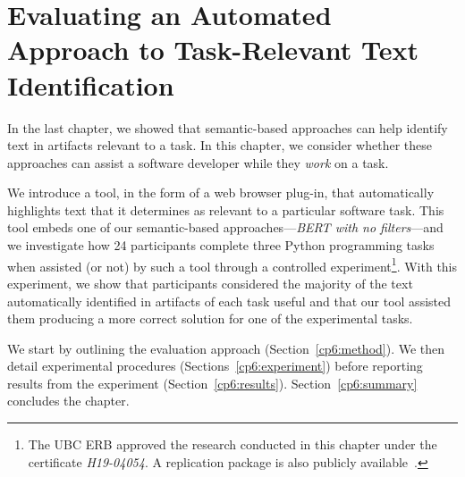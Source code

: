 \setcounter{chapter}{5}


\chapter{Evaluating an Automated Approach to Task-Relevant Text Identification}
\label{ch:assisting}


In the last chapter, we showed that semantic-based approaches can help identify text in artifacts relevant to a task. 
In this chapter, we consider whether these approaches can assist a software developer while they \textit{work} on a task.


We introduce a tool, in the form of a web browser plug-in, that automatically highlights 
text that it determines as relevant to a particular software task.
This tool embeds one of our semantic-based approaches---\textit{BERT with no filters}---and we investigate
how 24 participants complete three Python
programming tasks when assisted (or not) by such a tool through a controlled experiment\footnote{
    The \acs{UBC} \acs{ERB} approved the research conducted in this chapter under the certificate \textit{H19-04054}.
    A replication package is also publicly available~\cite{cp6_supplementary_material}.
}. 
With this experiment, we show that participants considered the majority of the text automatically identified in artifacts 
of each task useful and that 
our tool assisted them producing a more correct solution for one of the experimental tasks.


We start by outlining the evaluation approach  (Section~\ref{cp6:method}). We then
detail experimental procedures  (Sections~\ref{cp6:experiment}) before reporting
results from the experiment 
(Section~\ref{cp6:results}).
Section~\ref{cp6:summary} concludes the chapter.















